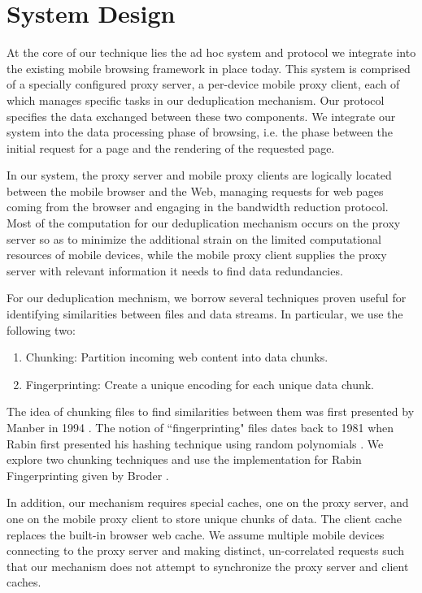 \section{System Design}
\label{sec:sys_design}
At the core of our technique lies the ad hoc system and protocol we integrate into the existing mobile browsing framework in place today. This system is comprised of a specially configured proxy server, a per-device mobile proxy client, each of which manages specific tasks in our deduplication mechanism. Our protocol specifies the data exchanged between these two components. We integrate our system into the data processing phase of browsing, i.e. the phase between the initial request for a page and the rendering of the requested page.

In our system, the proxy server and mobile proxy clients are logically located between the mobile browser and the Web, managing requests for web pages coming from the browser and engaging in the bandwidth reduction protocol. Most of the computation for our deduplication mechanism occurs on the proxy server so as to minimize the additional strain on the limited computational resources of mobile devices, while the mobile proxy client supplies the proxy server with relevant information it needs to find data redundancies. 

For our deduplication mechnism, we borrow several techniques proven useful for identifying similarities between files and data streams. In particular, we use the following two: 
\begin{enumerate}
\item Chunking: Partition incoming web content into data chunks.
\item Fingerprinting: Create a unique encoding for each unique data chunk.
\end{enumerate}
The idea of chunking files to find similarities between them was first presented by Manber in 1994 \cite{manber}. The notion of ``fingerprinting" files dates back to 1981 when Rabin first presented his hashing technique using random polynomials \cite{rabin}. We explore two chunking techniques and use the implementation for Rabin Fingerprinting given by Broder \cite{broder}. 

In addition, our mechanism requires special caches, one on the proxy server, and one on the mobile proxy client to store unique chunks of data. The client cache replaces the built-in browser web cache. We assume multiple mobile devices connecting to the proxy server and making distinct, un-correlated requests such that our mechanism does not attempt to synchronize the proxy server and client caches.






